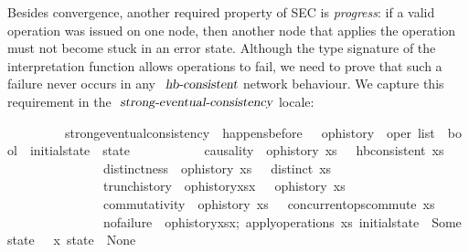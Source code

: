 Besides convergence, another required property of SEC is \emph{progress}: if a valid operation was issued on one node, then another node that applies the operation must not become stuck in an error state.
Although the type signature of the interpretation function allows operations to fail, we need to prove that such a failure never occurs in any $\isa{hb-consistent}$ network behaviour.
We capture this requirement in the $\isa{strong-eventual-consistency}$ locale:
\vspace{0.35em}
\begin{isabellebody}
\ \ \ \ \ \ \ \ \ strong{\isacharunderscore}eventual{\isacharunderscore}consistency\ {\isacharequal}\ happens{\isacharunderscore}before\ {\isacharplus}\ \ op{\isacharunderscore}history\ {\isacharcolon}{\isacharcolon}\ {\isachardoublequoteopen}{\isacharprime}oper\ list\ {\isasymRightarrow}\ bool{\isachardoublequoteclose}\ \ initial{\isacharunderscore}state\ {\isacharcolon}{\isacharcolon}\ {\isachardoublequoteopen}{\isacharprime}state{\isachardoublequoteclose}\isanewline
\ \ \ \ \ \ \ \ \ \ \ causality{\isacharcolon}\ {\isasymlbrakk}\ {\isachardoublequoteopen}op{\isacharunderscore}history\ xs\ {\isasymrbrakk}\ {\isasymLongrightarrow}\ hb{\isacharunderscore}consistent\ xs{\isachardoublequoteclose}\isanewline
\ \ \ \ \ \ \ \ \ \ \ \ \ \ \ distinctness{\isacharcolon}\ {\isasymlbrakk}\ {\isachardoublequoteopen}op{\isacharunderscore}history\ xs\ {\isasymrbrakk}\ {\isasymLongrightarrow}\ distinct\ xs{\isachardoublequoteclose}\isanewline
\ \ \ \ \ \ \ \ \ \ \ \ \ \ \ trunc{\isacharunderscore}history{\isacharcolon}\ {\isasymlbrakk}\ {\isachardoublequoteopen}op{\isacharunderscore}history{\isacharparenleft}xs{\isacharat}{\isacharbrackleft}x{\isacharbrackright}{\isacharparenright}\ {\isasymrbrakk}\ {\isasymLongrightarrow}\ op{\isacharunderscore}history\ xs{\isachardoublequoteclose}\isanewline
\ \ \ \ \ \ \ \ \ \ \ \ \ \ \ commutativity{\isacharcolon}\ {\isasymlbrakk}\ {\isachardoublequoteopen}op{\isacharunderscore}history\ xs\ {\isasymrbrakk}\ {\isasymLongrightarrow}\ concurrent{\isacharunderscore}ops{\isacharunderscore}commute\ xs{\isachardoublequoteclose}\isanewline
  \ \ \ \ \ \ \ \ \ \ \ \ \ \ \ no{\isacharunderscore}failure{\isacharcolon}\ {\isasymlbrakk}\ {\isachardoublequoteopen}op{\isacharunderscore}history{\isacharparenleft}xs{\isacharat}{\isacharbrackleft}x{\isacharbrackright}{\isacharparenright};\ apply{\isacharunderscore}operations\ xs\ initial{\isacharunderscore}state\ {\isacharequal}\ Some\ state\ {\isasymrbrakk}\ {\isasymLongrightarrow}\ {\isasymlangle}x{\isasymrangle}\ state\ {\isasymnoteq}\ None{\isachardoublequoteclose}
\end{isabellebody}
